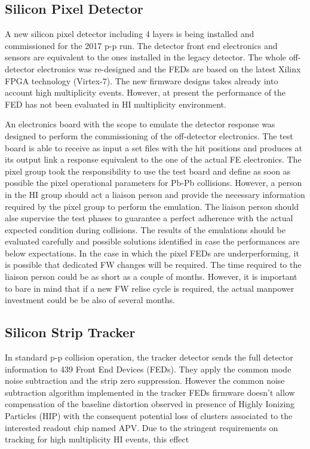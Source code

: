 \subsection{Silicon Pixel Detector\label{subsec:SiPixel}}
A new silicon pixel detector including 4 layers is being installed and commissioned for the 2017 p-p run. The detector front end electronics and sensors are equivalent to the ones installed in the legacy detector. The whole off-detector electronics was re-designed and the FEDs are based on the latest Xilinx FPGA technology (Virtex-7). The new firmware designs takes already into account high multiplicity events. However, at present the performance of the FED has not been evaluated in HI multiplicity environment. 

An electronics board with the scope to emulate the detector response was designed to perform the commissioning of the off-detector electronics. The test board is able to receive as input a set files with the hit positions and produces at its output link a response equivalent to the one of the actual FE electronics. The pixel group took the responsibility to use the test board and define as soon as possible the pixel operational parameters for Pb-Pb collisions. However, a person in the HI group should act a liaison person and provide the necessary information required by the pixel group to perform the emulation. The liaison person should alse supervise the test phases to guarantee a perfect adherence with the actual expected condition during collisions. The results of the emulations should be evaluated carefully and possible solutions identified in case the performances are below expectations. In the case in which the pixel FEDs are underperforming, it is possible that dedicated FW changes will be required. The time required to the liaison person could be as short as a couple of months. However, it is important to bare in mind that if a new FW relise cycle is required, the actual manpower investment could be be also of several months. 


\subsection{Silicon Strip Tracker\label{subsec:SiTracker}}
In standard p-p collision operation, the tracker detector sends the full detector information to 439 Front End Devices (FEDs). They apply the common mode noise subtraction and the strip zero suppression. However the common noise subtraction algorithm implemented in the tracker FEDs firmware doesn’t allow compensation of the baseline distortion observed in presence of Highly Ionizing Particles (HIP) with the consequent potential loss of clusters associated to the interested readout chip named APV. Due to the stringent requirements on tracking for high multiplicity HI events, this effect


